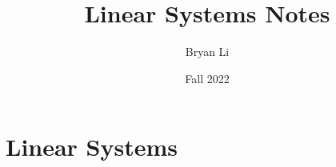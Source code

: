\documentclass{../mimosis}
\title{Linear Systems Notes}
\author{Bryan Li}
\date{Fall 2022}
\begin{document}
    \frontmatter
    \maketitle
    \tableofcontents
    \mainmatter
    \part{Linear Systems}
    
\end{document}
